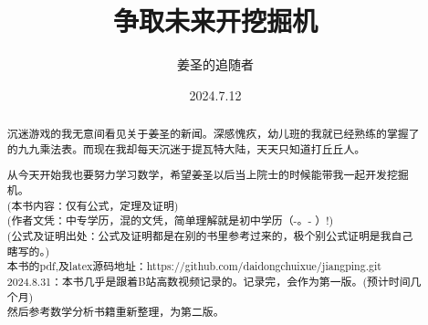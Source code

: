 
\title{争取未来开挖掘机} %
\author{姜圣的追随者}  %
\date{2024.7.12} %

\maketitle %
\newpage
\begin{abstract}
    沉迷游戏的我无意间看见关于姜圣的新闻。深感愧疚，幼儿班的我就已经熟练的掌握了的九九乘法表。而现在我却每天沉迷于提瓦特大陆，天天只知道打丘丘人。\par 从今天开始我也要努力学习数学，希望姜圣以后当上院士的时候能带我一起开发挖掘机。
    \\(本书内容：仅有公式，定理及证明)
    \\(作者文凭：中专学历，混的文凭，简单理解就是初中学历（-。- ）!)
    \\(公式及证明出处：公式及证明都是在别的书里参考过来的，极个别公式证明是我自己瞎写的。)
    \\本书的pdf,及latex源码地址：https://github.com/daidongchuixue/jiangping.git
    \\2024.8.31：本书几乎是跟着B站高数视频记录的。记录完，会作为第一版。(预计时间几个月)\\
    然后参考数学分析书籍重新整理，为第二版。
\end{abstract}
\newpage
\renewcommand{\contentsname}{目录}
\tableofcontents %


\pagestyle{fancy} %

